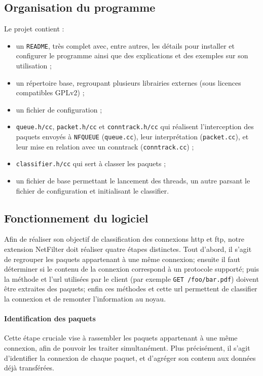 \subsection{Organisation du programme}
  Le projet contient :
  \begin{itemize}
    \item un \verb+README+, très complet avec, entre autres, les détails pour installer et configurer le programme ainsi que des explications et des exemples sur son utilisation ;
    \item un répertoire base, regroupant plusieurs librairies externes (sous
    licences compatibles GPLv2) ;
    \item un fichier de configuration ;
    \item \verb+queue.h/cc+, \verb+packet.h/cc+ et \verb+conntrack.h/cc+ qui réalisent l'interception des paquets envoyés à \verb+NFQUEUE+ (\verb+queue.cc+), leur
    interprétation (\verb+packet.cc+), et leur mise en relation avec un conntrack
    (\verb+conntrack.cc+) ;
    \item \verb+classifier.h/cc+ qui sert à classer les paquets ;
    \item un fichier de base permettant le lancement des threads, un autre parsant le fichier de configuration et initialisant le classifier.
  \end{itemize}

\subsection{Fonctionnement du logiciel}
  Afin de réaliser son objectif de classification des connexions http et ftp, notre extension NetFilter doit
  réaliser quatre étapes distinctes. Tout d'abord, il s'agit de regrouper les paquets appartenant à une même
  connexion; ensuite il faut déterminer si le contenu de la connexion correspond à un protocole supporté;
  puis la méthode et l'url utilisées par le client (par exemple {\tt GET /foo/bar.pdf}) doivent être extraites
  des paquets; enfin ces méthodes et cette url permettent de classifier la connexion et de remonter l'information
  au noyau.
  
  \paragraph{Identification des paquets}
    Cette étape cruciale vise à rassembler les paquets appartenant à une même connexion, afin de pouvoir
    les traiter simultanément. Plus précisément, il s'agit d'identifier la connexion de chaque paquet,
    et d'agréger son contenu aux données déjà transférées.
    
